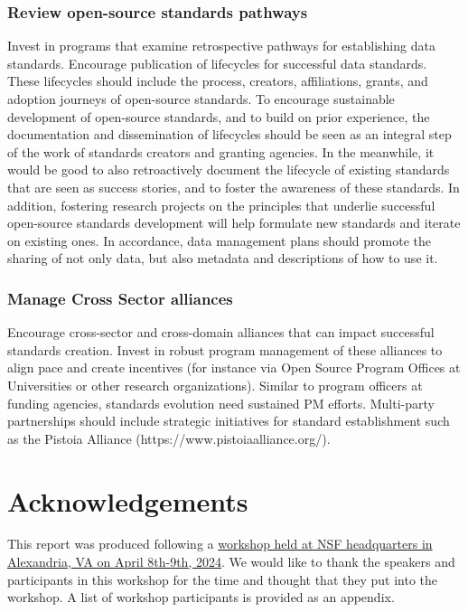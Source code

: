 \documentclass[
  letterpaper,
  DIV=11,
  numbers=noendperiod]{scrartcl}
\begin{document}
\subsubsection{Review open-source standards
pathways}\label{review-open-source-standards-pathways}

Invest in programs that examine retrospective pathways for establishing
data standards. Encourage publication of lifecycles for successful data
standards. These lifecycles should include the process, creators,
affiliations, grants, and adoption journeys of open-source standards. To
encourage sustainable development of open-source standards, and to build
on prior experience, the documentation and dissemination of lifecycles
should be seen as an integral step of the work of standards creators and
granting agencies. In the meanwhile, it would be good to also
retroactively document the lifecycle of existing standards that are seen
as success stories, and to foster the awareness of these standards. In
addition, fostering research projects on the principles that underlie
successful open-source standards development will help formulate new
standards and iterate on existing ones. In accordance, data management
plans should promote the sharing of not only data, but also metadata and
descriptions of how to use it.

\subsubsection{Manage Cross Sector
alliances}\label{manage-cross-sector-alliances}

Encourage cross-sector and cross-domain alliances that can impact
successful standards creation. Invest in robust program management of
these alliances to align pace and create incentives (for instance via
Open Source Program Offices at Universities or other research
organizations). Similar to program officers at funding agencies,
standards evolution need sustained PM efforts. Multi-party partnerships
should include strategic initiatives for standard establishment such as
the Pistoia Alliance (https://www.pistoiaalliance.org/).

\section{Acknowledgements}\label{acknowledgements}

This report was produced following a
\href{https://uwescience.github.io/2024-open-source-standards-workshop/}{workshop
held at NSF headquarters in Alexandria, VA on April 8th-9th, 2024}. We
would like to thank the speakers and participants in this workshop for
the time and thought that they put into the workshop. A list of workshop
participants is provided as an appendix.
\end{document}
